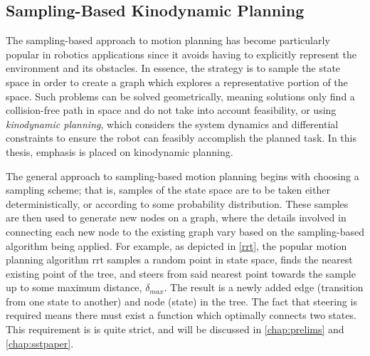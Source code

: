 
\subsection{Sampling-Based Kinodynamic Planning}\label{intro:sbmp}

The sampling-based approach to motion planning has become particularly popular in robotics applications since it avoids having to explicitly represent the environment and its obstacles. In essence, the strategy is to sample the state space in order to create a graph which explores a representative portion of the space. Such problems can be solved geometrically, meaning solutions only find a collision-free path in space and do not take into account feasibility, or using \emph{kinodynamic planning}, which considers the system dynamics and differential constraints to ensure the robot can feasibly accomplish the planned task. In this thesis, emphasis is placed on kinodynamic planning.

The general approach to sampling-based motion planning begins with choosing a sampling scheme; that is, samples of the state space are to be taken either deterministically, or according to some probability distribution. These samples are then used to generate new nodes on a graph, where the details involved in connecting each new node to the existing graph vary based on the sampling-based algorithm being applied. For example, as depicted in \autoref{rrt}, the popular motion planning algorithm \gls{rrt} samples a random point in state space, finds the nearest existing point of the tree, and steers from said nearest point towards the sample up to some maximum distance, $\delta_{max}$. The result is a newly added edge (transition from one state to another) and node (state) in the tree. The fact that steering is required means there must exist a function which optimally connects two states. This requirement is is quite strict, and will be discussed in \autoref{chap:prelims} and \autoref{chap:sstpaper}.

